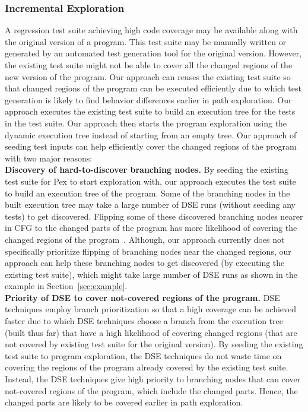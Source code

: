 \subsubsection{Incremental Exploration}
\label{sec:incremental}
A regression test suite achieving high code coverage may be available along with the original version of  a program. This test suite may be manually written or generated by an automated test generation tool for the original version. However, the existing test suite might not be able to cover all the changed regions of the new version of the program. Our approach can reuses the existing test suite so that changed regions of the program can be executed efficiently due to which test generation is likely to find behavior differences earlier in path exploration. Our approach executes the existing test suite to build an execution
tree for the tests in the test suite. Our approach then starts the program
exploration using the dynamic execution tree instead of starting from an empty
tree. Our approach of seeding test inputs can help efficiently cover the changed regions of the program with two major reasons:
\\ \textbf{Discovery of hard-to-discover branching nodes.} By seeding the existing test suite for Pex to start exploration with, our approach executes the test suite to build an execution tree of the program. Some of the branching nodes in the built execution tree may take a large number of DSE runs (without seeding any tests) to get discovered. Flipping some of these discovered branching nodes nearer in CFG to the changed parts of the
program has more likelihood of covering the changed regions of the program~\cite{burnim}. Although, our approach currently does not specifically prioritize flipping of branching nodes near the changed regions, our approach can help these branching nodes to get discovered (by executing the existing test suite), which might take large number of DSE runs as shown in the example in Section~\ref{sec:example}.
\\ \textbf{Priority of DSE to cover not-covered regions of the program.} DSE techniques employ branch prioritization so that a high coverage can be achieved faster due to which DSE techniques choose a branch from the execution tree (built thus far) that have a high likelihood of covering changed regions (that are not covered by existing test suite for the original version). By seeding the existing test suite to program exploration, the DSE techniques do not waste time on covering the regions of the program already covered by the existing test suite. Instead, the DSE techniques give high priority to branching nodes that can cover not-covered regions of the program, which include the changed parts. Hence, the changed parts are likely to be covered earlier in path exploration.
 
